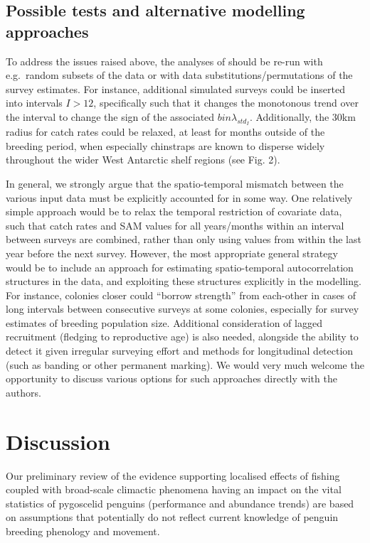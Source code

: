 \documentclass[]{elsarticle} %
\begin{document}
\subsection{Possible tests and alternative modelling
approaches}\label{possible-tests-and-alternative-modelling-approaches}

To address the issues raised above, the analyses of \citet{Kruger2021}
should be re-run with e.g.~random subsets of the data or with data
substitutions/permutations of the survey estimates. For instance,
additional simulated surveys could be inserted into intervals \(I>12\),
specifically such that it changes the monotonous trend over the interval
to change the sign of the associated \(bin\lambda_{std_I}\).
Additionally, the 30km radius for catch rates could be relaxed, at least
for months outside of the breeding period, when especially chinstraps
are known to disperse widely throughout the wider West Antarctic shelf
regions (see Fig. 2).

In general, we strongly argue that the spatio-temporal mismatch between
the various input data must be explicitly accounted for in some way. One
relatively simple approach would be to relax the temporal restriction of
covariate data, such that catch rates and SAM values for all
years/months within an interval between surveys are combined, rather
than only using values from within the last year before the next survey.
However, the most appropriate general strategy would be to include an
approach for estimating spatio-temporal autocorrelation structures in
the data, and exploiting these structures explicitly in the modelling.
For instance, colonies closer could ``borrow strength'' from each-other
in cases of long intervals between consecutive surveys at some colonies,
especially for survey estimates of breeding population size. Additional
consideration of lagged recruitment (fledging to reproductive age) is
also needed, alongside the ability to detect it given irregular
surveying effort and methods for longitudinal detection (such as banding
or other permanent marking). We would very much welcome the opportunity
to discuss various options for such approaches directly with the
authors.

\section{Discussion}\label{discussion}

Our preliminary review of the evidence supporting localised effects of
fishing coupled with broad-scale climactic phenomena having an impact on
the vital statistics of pygoscelid penguins (performance and abundance
trends) are based on assumptions that potentially do not reflect current
knowledge of penguin breeding phenology and movement.
\end{document}
